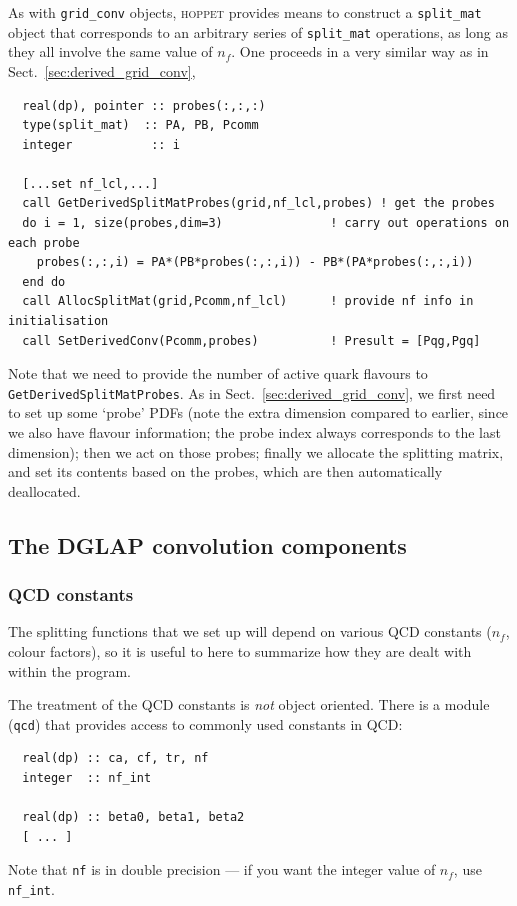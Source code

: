 \documentclass[12pt]{article}
\newcommand{\hoppet}{\textsc{hoppet}\xspace}
\newcommand{\ttt}[1]{\texttt{#1}}
\begin{document}
As with \ttt{grid\_conv} objects, \hoppet provides means to construct
a \ttt{split\_mat} object that corresponds to an arbitrary series of
\ttt{split\_mat} operations, as long as they all involve the same
value of $n_f$. One proceeds in a very similar way as
in Sect.~\ref{sec:derived_grid_conv},
\begin{lstlisting}
  real(dp), pointer :: probes(:,:,:)
  type(split_mat)  :: PA, PB, Pcomm
  integer           :: i

  [...set nf_lcl,...]
  call GetDerivedSplitMatProbes(grid,nf_lcl,probes) ! get the probes
  do i = 1, size(probes,dim=3)               ! carry out operations on each probe
    probes(:,:,i) = PA*(PB*probes(:,:,i)) - PB*(PA*probes(:,:,i))
  end do
  call AllocSplitMat(grid,Pcomm,nf_lcl)      ! provide nf info in initialisation
  call SetDerivedConv(Pcomm,probes)          ! Presult = [Pqg,Pgq]
\end{lstlisting}
Note that we need to provide the number of active quark flavours
to \ttt{GetDerivedSplitMatProbes}.
As in Sect.~\ref{sec:derived_grid_conv}, we first need to set up
some `probe' PDFs (note the extra dimension compared to earlier, since
we also have flavour information; the probe index always corresponds
to the last dimension); then we act on those probes; finally we
allocate the splitting matrix, and set its contents based on the
probes, which are then automatically deallocated.



\subsection{The DGLAP convolution components}
\label{sec:dglap_holder}

\subsubsection{QCD constants}
\label{sec:qcd}

The splitting functions that we set up will depend on various QCD
constants ($n_f$, colour factors), so it is useful to here to
summarize how they are dealt with within the program.

The treatment of the QCD constants is \emph{not} object oriented.
There is a module (\ttt{qcd}) that provides access to commonly used
constants in QCD:
\begin{lstlisting}
  real(dp) :: ca, cf, tr, nf
  integer  :: nf_int
  
  real(dp) :: beta0, beta1, beta2
  [ ... ]
\end{lstlisting}
Note that \ttt{nf} is in double precision
 --- if you want the integer value of $n_f$, use \ttt{nf\_int}. 
\end{document}
